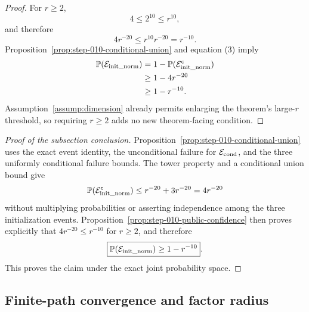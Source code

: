 \begin{proof}
For \(r\ge2\),
\[
  4\le2^{10}\le r^{10},
\]
and therefore
\[
  4r^{-20}\le r^{10}r^{-20}=r^{-10}.                     \tag{3}
\]
Proposition~\ref{prop:step-010-conditional-union} and equation (3) imply
\[
\begin{aligned}
  \mathbb P(\mathcal E_{\rm init\_norm})
  &=1-\mathbb P(\mathcal E_{\rm init\_norm}^{\mathsf c})\\
  &\ge1-4r^{-20}\\
  &\ge1-r^{-10}.
\end{aligned}
\]
Assumption~\ref{assump:dimension} already permits enlarging the theorem's
large-\(r\) threshold, so requiring \(r\ge2\) adds no new theorem-facing
condition. 

\end{proof}

\begin{proof}[Proof of the subsection conclusion]

Proposition~\ref{prop:step-010-conditional-union} uses the exact event
identity, the unconditional failure for \(\mathcal E_{\rm cond}\),
and the three uniformly conditional failure bounds. The tower
property and a conditional union bound give
\[
  \mathbb P(\mathcal E_{\rm init\_norm}^{\mathsf c})
  \le r^{-20}+3r^{-20}=4r^{-20}
\]
without multiplying probabilities or asserting independence among the three
initialization events. Proposition~\ref{prop:step-010-public-confidence}
then proves explicitly that \(4r^{-20}\le r^{-10}\) for \(r\ge2\), and
therefore
\[
  \boxed{\mathbb P(\mathcal E_{\rm init\_norm})\ge1-r^{-10}}.
\]
This proves the claim under the exact joint probability space.

\end{proof}

\subsection{Finite-path convergence and factor radius}\label{app:step-011}

